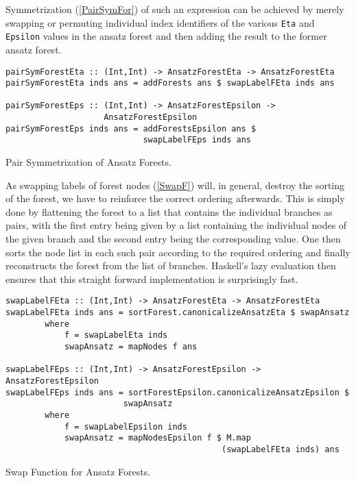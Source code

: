 Symmetrization (\ref{PairSymFor}) of such an expression can be achieved by merely swapping or permuting individual index identifiers of the various \texttt{Eta} and \texttt{Epsilon} values in the ansatz forest and then adding the result to the former ansatz forest.
\begin{listing}[hbt!] 
\begin{verbatim}
pairSymForestEta :: (Int,Int) -> AnsatzForestEta -> AnsatzForestEta
pairSymForestEta inds ans = addForests ans $ swapLabelFEta inds ans

pairSymForestEps :: (Int,Int) -> AnsatzForestEpsilon ->
                    AnsatzForestEpsilon
pairSymForestEps inds ans = addForestsEpsilon ans $ 
                            swapLabelFEps inds ans
\end{verbatim} 
\caption{Pair Symmetrization of Ansatz Forests.}\label{PairSymFor}
\end{listing}
As swapping labels of forest nodes (\ref{SwapF}) will, in general, destroy the sorting of the forest, we have to reinforce the correct ordering afterwards. This is simply done by flattening the forest to a list that contains the individual branches as pairs, with the first entry being given by a list containing the individual nodes of the given branch and the second entry being the corresponding value. One then sorts the node list in each such pair according to the required ordering and finally reconstructs the forest from the list of branches.
Haskell's lazy evaluation then ensures that this straight forward implementation is surprisingly fast.
\begin{listing}[hbt!] 
\begin{verbatim}
swapLabelFEta :: (Int,Int) -> AnsatzForestEta -> AnsatzForestEta
swapLabelFEta inds ans = sortForest.canonicalizeAnsatzEta $ swapAnsatz
        where
            f = swapLabelEta inds
            swapAnsatz = mapNodes f ans

swapLabelFEps :: (Int,Int) -> AnsatzForestEpsilon -> AnsatzForestEpsilon
swapLabelFEps inds ans = sortForestEpsilon.canonicalizeAnsatzEpsilon $ 
                        swapAnsatz
        where
            f = swapLabelEpsilon inds
            swapAnsatz = mapNodesEpsilon f $ M.map 
                                            (swapLabelFEta inds) ans
\end{verbatim}
\caption{Swap Function for Ansatz Forests.}\label{SwapF}
\end{listing}

